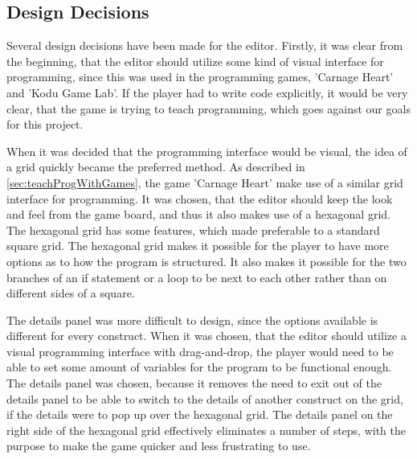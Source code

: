 \subsection{Design Decisions}
Several design decisions have been made for the editor.
Firstly, it was clear from the beginning, that the editor should utilize some kind of visual interface for programming, since this was used in the programming games, 'Carnage Heart' and 'Kodu Game Lab'.
If the player had to write code explicitly, it would be very clear, that the game is trying to teach programming, which goes against our goals for this project.\newline

When it was decided that the programming interface would be visual, the idea of a grid quickly became the preferred method.
As described in \autoref{sec:teachProgWithGames}, the game 'Carnage Heart' make use of a similar grid interface for programming.
It was chosen, that the editor should keep the look and feel from the game board, and thus it also makes use of a hexagonal grid.
The hexagonal grid has some features, which made preferable to a standard square grid.
The hexagonal grid makes it possible for the player to have more options as to how the program is structured.
It also makes it possible for the two branches of an if statement or a loop to be next to each other rather than on different sides of a square.\newline

The details panel was more difficult to design, since the options available is different for every construct.
When it was chosen, that the editor should utilize a visual programming interface with drag-and-drop, the player would need to be able to set some amount of variables for the program to be functional enough.
The details panel was chosen, because it removes the need to exit out of the details panel to be able to switch to the details of another construct on the grid, if the details were to pop up over the hexagonal grid.
The details panel on the right side of the hexagonal grid effectively eliminates a number of steps, with the purpose to make the game quicker and less frustrating to use.
